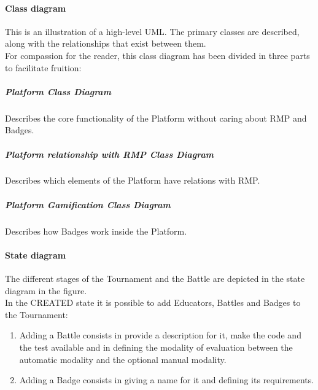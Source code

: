 \paragraph{Class diagram}
This is an illustration of a high-level UML. The primary classes are described, along with the relationships that exist between them.
\\For compassion for the reader, this class diagram has been divided in three parts to facilitate fruition:
\newpage
\subparagraph{Platform Class Diagram}
Describes the core functionality of the Platform without caring about RMP and Badges.\\
\newpage
\subparagraph{Platform relationship with RMP Class Diagram}
Describes which elements of the Platform have relations with RMP.\\
\subparagraph{Platform Gamification Class Diagram}
Describes how Badges work inside the Platform.\\
\newpage 

\paragraph{State diagram}
The different stages of the Tournament and the Battle are depicted in the state diagram in the figure.
\\In the CREATED state it is possible to add Educators, Battles and Badges to the Tournament:
\begin{enumerate}[label=$\bullet$]
    \item Adding a Battle consists in provide a description for it, make the code and the test available and in defining the modality of evaluation between the automatic modality and the optional manual modality.
    \item Adding a Badge consists in giving a name for it and defining its requirements.
\end{enumerate}
\newpage

